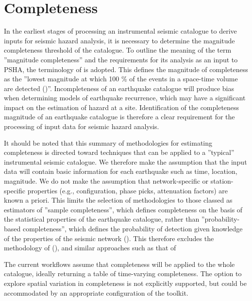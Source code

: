  


\section{Completeness}

In the earliest stages of processing an instrumental seismic catalogue to derive inputs for seismic hazard analysis, it is necessary to determine the magnitude completeness threshold of the catalogue. To outline the meaning of the term ''magnitude completeness'' and the requirements for its analysis as an input to PSHA, the terminology of \cite{MignanWoessner2012} is adopted. This defines the magnitude of completeness as the ''lowest magnitude at which 100 \% of the events in a space-time volume are detected (\cite{RydelekSacks1989, WoessnerWiemer2005})''. Incompleteness of an earthquake catalogue will produce bias when determining models of earthquake recurrence, which may have a significant impact on the estimation of hazard at a site. Identification of the completeness magnitude of an earthquake catalogue is therefore a clear requirement for the processing of input data for seismic hazard analysis.

It should be noted that this summary of methodologies for estimating completeness is directed toward techniques that can be applied to a ''typical'' instrumental seismic catalogue. We therefore make the assumption that the input data will contain basic information for each earthquake such as time, location, magnitude. We do not make the assumption that network-specific or station-specific properties (e.g., configuration, phase picks, attenuation factors) are known a priori. This limits the selection of methodologies to those classed as estimators of ''sample completeness'', which defines completeness on the basis of the statistical properties of the earthquake catalogue, rather than ''probability-based completeness'', which defines the probability of detection given knowledge of the properties of the seismic network (\cite{SchorlemmerWoessner2008}). This therefore excludes the methodology of (\cite{SchorlemmerWoessner2008}), and similar approaches such as that of \cite{Felzer2008}

The current workflows assume that completeness will be applied to the whole catalogue, ideally returning a table of time-varying completeness. The option to explore spatial variation in completeness is not explicitly supported, but could be accommodated by an appropriate configuration of the toolkit.

